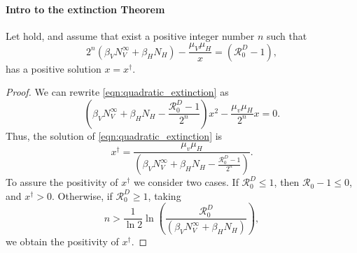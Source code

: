%
\paragraph{Intro to the extinction Theorem}
\begin{lemma}
    \label{lem:quadratic_equation}
    Let  hold, 
    and assume that exist a positive integer number $n$
    such that 
    \begin{equation}\label{eqn:quadratic_extinction}
        2^n
        \left(
            \beta_V
             N_V^{\infty} +
            \beta_H N_H
        \right) 
        - \frac{\mu_V \mu_H}{x}
        =
        \left(
            \mathcal{R}_0^D -1
        \right),
    \end{equation}
    has a positive solution $x=x^\dagger$. 
\end{lemma}
%
\begin{proof}
    We can rewrite \eqref{eqn:quadratic_extinction} as
    \begin{equation*}
        \left(
             \beta_V
             N_V ^ {\infty} +
            \beta_H N_H            
            -\frac{\mathcal{R}_0 ^ D - 1}{2 ^ n}
        \right) x ^ 2
        - \frac{\mu_v \mu_H}{2 ^ n} x
        = 0.
    \end{equation*}
    Thus, the solution of \eqref{eqn:quadratic_extinction} is
    \begin{equation}
        \label{eqn:quadratic_solution}
        x^{\dagger} = 
            \frac{\mu_v \mu_H}{
                \left(
                     \beta_V
                     N_V ^ {\infty} +
                    \beta_H N_H
                    -\frac{\mathcal{R}_0 ^ D - 1}{2 ^ n}
                \right)
            }.
    \end{equation}
    To assure the positivity of $x^{\dagger}$ we consider two cases.
    If $\mathcal{R}_0 ^ D \leq 1$, 
    then $\mathcal{R}_0 - 1 \leq 0$, and $x^{\dagger} >0$.
    Otherwise, if $\mathcal{R}_0 ^ D \geq 1$,
    taking 
    \begin{equation}
        \label{eqn:n_condition}
        n > \frac{1}{\ln 2} 
            \ln
            \left(
                \displaystyle
                \frac{\mathcal{R}_0 ^ D}{
                    \left(
                         \beta_V
                         N_V ^ {\infty} +
                        \beta_H N_H
                    \right)
                }    
            \right),
    \end{equation}
    we obtain the positivity of $x^{\dagger}$.
\end{proof}
